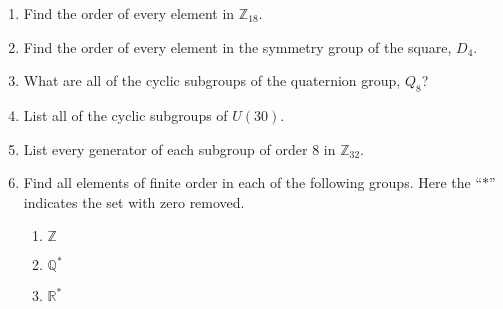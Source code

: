 {\begin{enumerate}
\begin{multicols}{3}
\begin{enumerate}
\item
$\displaystyle
\begin{pmatrix}
1 & -1 \\
0 & 1
\end{pmatrix}
$

\item
$\displaystyle
\begin{pmatrix}
1 & -1 \\
-1 & 0
\end{pmatrix}
$
 
\item
$\displaystyle
\begin{pmatrix}
\sqrt{3}/ 2 & 1/2 \\
-1/2 & \sqrt{3}/2
\end{pmatrix}
$

 \end{enumerate}
\end{multicols}

 

\item		  %
Find the order of every element in ${\mathbb Z}_{18}$.
 
 
\item
Find the order of every element in the symmetry group of the square,
$D_4$.
 
 
\item
What are all of the cyclic subgroups of the quaternion group, $Q_8$? 
 
 
\item
List all of the cyclic subgroups of $U(30)$.
 
 
\item
List every generator of each subgroup of order 8 in ${\mathbb
Z}_{32}$.
 
\item
Find all elements of finite order in each of the following groups. Here the ``$\ast$'' indicates the set with zero removed.
\begin{multicols}{3}
\begin{enumerate}
 
 \item
${\mathbb Z}$
 
 \item
${\mathbb Q}^\ast$
 
 \item
${\mathbb R}^\ast$
 
\end{enumerate}
 \end{multicols}
 

\end{enumerate}}
